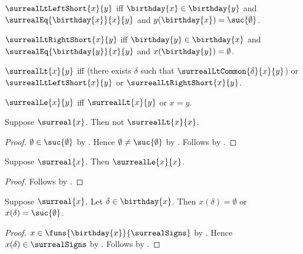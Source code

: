 \begin{definition}\label{surreal_lt_left_short}
    $\surrealLtLeftShort{x}{y}$ iff
        $\birthday{x}\in\birthday{y}$ and
        $\surrealEq{\birthday{x}}{x}{y}$ and
        $y(\birthday{x})=\suc{\emptyset}$.
\end{definition}

\begin{definition}\label{surreal_lt_right_short}
    $\surrealLtRightShort{x}{y}$ iff
        $\birthday{y}\in\birthday{x}$ and
        $\surrealEq{\birthday{y}}{x}{y}$ and
        $x(\birthday{y})=\emptyset$.
\end{definition}

\begin{definition}\label{surreal_lt}
    $\surrealLt{x}{y}$ iff
        (there exists $\delta$ such that
            $\surrealLtCommon{\delta}{x}{y}$) or
        $\surrealLtLeftShort{x}{y}$ or
        $\surrealLtRightShort{x}{y}$.
\end{definition}

\begin{definition}\label{surreal_le}
    $\surrealLe{x}{y}$ iff $\surrealLt{x}{y}$ or $x=y$.
\end{definition}

\begin{proposition}\label{surreal_lt_irreflexive}
    Suppose $\surreal{x}$.
    Then not $\surrealLt{x}{x}$.
\end{proposition}
\begin{proof}
    $\emptyset\in\suc{\emptyset}$ by .
    Hence $\emptyset\neq\suc{\emptyset}$
        by .
    Follows by
        .
\end{proof}

\begin{proposition}\label{surreal_le_reflexive}
    Suppose $\surreal{x}$.
    Then $\surrealLe{x}{x}$.
\end{proposition}
\begin{proof}
    Follows by .
\end{proof}

\begin{proposition}\label{surreal_value_cases}
    Suppose $\surreal{x}$.
    Let $\delta\in\birthday{x}$.
    Then $x(\delta)=\emptyset$ or
        $x(\delta)=\suc{\emptyset}$.
\end{proposition}
\begin{proof}
    $x\in\funs{\birthday{x}}{\surrealSigns}$
        by .
    Hence $x(\delta)\in\surrealSigns$
        by .
    Follows by .
\end{proof}

